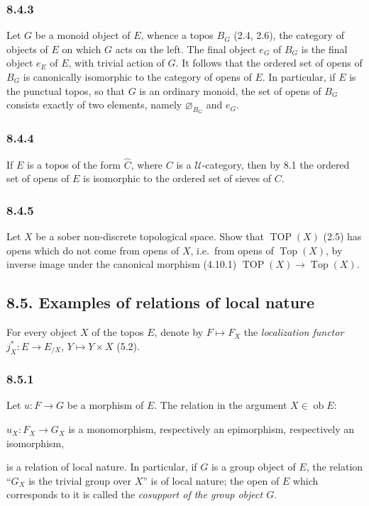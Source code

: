 \documentclass[11pt]{article}
\newcommand{\U}{\mathcal{U}}
\newcommand{\Top}{\operatorname{Top}}
\newcommand{\TOP}{\operatorname{TOP}}
\newcommand{\ie}{i.e.}
\providecommand{\ob}{\operatorname{ob}}
\begin{document}
\subsubsection*{8.4.3}
Let \(G\) be a monoid object of \(E\), whence a topos \(B_G\) (2.4, 2.6), the category of objects of \(E\) on which \(G\) acts on the left. The final object \(e_G\) of \(B_G\) is the final object \(e_E\) of \(E\), with trivial action of \(G\). It follows that the ordered set of opens of \(B_G\) is canonically isomorphic to the category of opens of \(E\). In particular, if \(E\) is the punctual topos, so that \(G\) is an ordinary monoid, the set of opens of \(B_G\) consists exactly of two elements, namely \(\varnothing_{B_G}\) and \(e_G\).

\subsubsection*{8.4.4}
If \(E\) is a topos of the form \(\widehat C\), where \(C\) is a \(\U\)-category, then by 8.1 the ordered set of opens of \(E\) is isomorphic to the ordered set of sieves of \(C\).

\subsubsection*{8.4.5}
Let \(X\) be a sober non-discrete topological space. Show that \(\TOP(X)\) (2.5) has opens which do not come from opens of \(X\), \ie\ from opens of \(\Top(X)\), by inverse image under the canonical morphism (4.10.1) \(\TOP(X)\to\Top(X)\).

\subsection*{8.5. Examples of relations of local nature}

For every object \(X\) of the topos \(E\), denote by \(F\mapsto F_X\) the \emph{localization functor} \(j_X^*:E\to E_{/X}\), \(Y\mapsto Y\times X\) (5.2).

\subsubsection*{8.5.1}
Let \(u:F\to G\) be a morphism of \(E\). The relation in the argument \(X\in\ob E\):
\begin{center}
\(u_X:F_X\to G_X\) is a monomorphism, respectively an epimorphism, respectively an isomorphism,
\end{center}
is a relation of local nature. In particular, if \(G\) is a group object of \(E\), the relation ``\(G_X\) is the trivial group over \(X\)'' is of local nature; the open of \(E\) which corresponds to it is called the \emph{cosupport of the group object \(G\)}.
\end{document}

